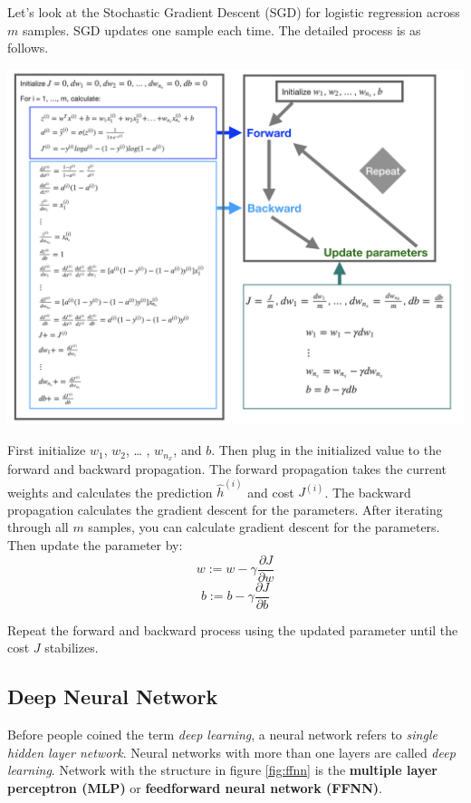 \documentclass[
  12pt,
]{krantz}
\begin{document}
Let's look at the Stochastic Gradient Descent (SGD) for logistic regression across \(m\) samples. SGD updates one sample each time. The detailed process is as follows.

\includegraphics[width=1\textwidth,height=\textheight]{images/GradientDescent.png}

First initialize \(w_1\), \(w_2\), \ldots{} , \(w_{n_x}\), and \(b\). Then plug in the initialized value to the forward and backward propagation. The forward propagation takes the current weights and calculates the prediction \(\hat{h}^{(i)}\) and cost \(J^{(i)}\). The backward propagation calculates the gradient descent for the parameters. After iterating through all \(m\) samples, you can calculate gradient descent for the parameters. Then update the parameter by:
\[w := w - \gamma \frac{\partial J}{\partial w}\]
\[b := b - \gamma \frac{\partial J}{\partial b}\]

Repeat the forward and backward process using the updated parameter until the cost \(J\) stabilizes.

\hypertarget{deepneuralnetwork}{%
\subsection{Deep Neural Network}\label{deepneuralnetwork}}

Before people coined the term \emph{deep learning}, a neural network refers to \emph{single hidden layer network}. Neural networks with more than one layers are called \emph{deep learning}. Network with the structure in figure \ref{fig:ffnn} is the \textbf{multiple layer perceptron (MLP)} or \textbf{feedforward neural network (FFNN)}.
\end{document}
